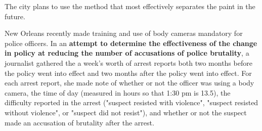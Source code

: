 \documentclass[addpoints]{examsetup}\usepackage[]{graphicx}\usepackage[]{color}
\begin{document}
\begin{questions}
The city plans to use the method that most effectively separates the paint in the future.



\pagebreak

\question

New Orleans recently made training and use of body cameras mandatory for police officers.
In an \textbf{attempt to determine the effectiveness of the change in policy at reducing the number of accusations of police brutality}, 
a journalist gathered the a week's worth of arrest reports both two months before the policy went into effect and two months after the policy went into effect. 
For each arrest report, she made note of
whether or not the officer was using a body camera,
the time of day (measured in hours so that 1:30 pm is 13.5),
the difficulty reported in the arrest ("suspect resisted with violence", "suspect resisted without violence", or "suspect did not resist"),
and
whether or not the suspect made an accusation of brutality after the arrest.


\end{questions}
\end{document}
